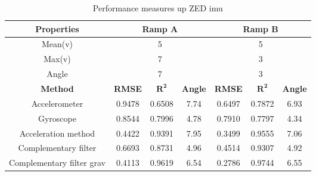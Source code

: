 
\begin{table}[htbp]
	\centering
	\caption{Performance measures up ZED \gls{imu}}
	\label{tab:eval_table_imu_up}
	\begin{tabular}[t]{ccccccc}
		\toprule
		\textbf{Properties}       & \multicolumn{3}{c}{\textbf{Ramp A}} & \multicolumn{3}{c}{\textbf{Ramp B}}                                                                    \\
		\midrule
		Mean(v)                   & \multicolumn{3}{c}{5}               & \multicolumn{3}{c}{5}                                                                                  \\
		Max(v)                    & \multicolumn{3}{c}{7}               & \multicolumn{3}{c}{3}                                                                                  \\
		Angle                     & \multicolumn{3}{c}{7}               & \multicolumn{3}{c}{3}                                                                                  \\
		\hline
		\textbf{Method}           & \textbf{RMSE}                       & $\mathbf{R^2}$                      & \textbf{Angle} & \textbf{RMSE} & $\mathbf{R^2}$ & \textbf{Angle} \\
		\cmidrule(lr){2-4}   \cmidrule(lr){5-7}
		Accelerometer             & 0.9478                              & 0.6508                              & 7.74           & 0.6497        & 0.7872         & 6.93           \\
		Gyroscope                 & 0.8544                              & 0.7996                              & 4.78           & 0.7910        & 0.7797         & 4.34           \\
		Acceleration method       & 0.4422                              & 0.9391                              & 7.95           & 0.3499        & 0.9555         & 7.06           \\
		Complementary filter      & 0.6693                              & 0.8731                              & 4.96           & 0.4514        & 0.9307         & 4.92           \\
		Complementary filter grav & 0.4113                              & 0.9619                              & 6.54           & 0.2786        & 0.9744         & 6.55           \\
		\bottomrule
	\end{tabular}
\end{table}
